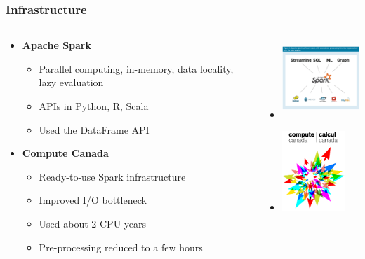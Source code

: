 \documentclass[slidestop,compress,red,mathserif]{beamer}
\newcommand{\colorcite}[1]{\colorlet{saved}{.}\color{sangria}\cite{#1}\color{saved}}
\begin{document}
\begin{frame}
  \frametitle{Infrastructure}
  \begin{columns}
  \begin{column}{0.6\textwidth}
  \begin{itemize}
    \item \textbf{Apache Spark} \colorcite{zaharia2010spark}       
    \begin{itemize}
    \item Parallel computing, in-memory, data locality, lazy evaluation
    \item APIs in Python, R, Scala
    \item Used the DataFrame API
    \end{itemize}
    \item \textbf{Compute Canada}
    \begin{itemize}
      \item Ready-to-use Spark infrastructure
      \item Improved I/O bottleneck
      \item Used about 2 CPU years
      \item Pre-processing reduced to a few hours
    \end{itemize}
  \end{itemize}
  \end{column}
\begin{column}{0.4\textwidth}
  \begin{itemize}
  \item[] \includegraphics[height=3cm, keepaspectratio]{Figures/spark.png}
  \item[] \includegraphics[height=3cm, keepaspectratio]{Figures/cc-logo.png}
  \end{itemize}
\end{column}
\end{columns}
\end{frame}
\end{document}
